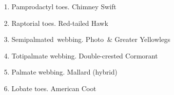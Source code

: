 \documentclass[11pt]{article}
\begin{document}
\begin{multicols}{2}
\begin{enumerate}[itemsep=1cm]
\item Pamprodactyl toes. \newline Chimney Swift
\item Raptorial toes. \newline Red-tailed Hawk
\item Semipalmated~webbing. Photo~\& Greater Yellowlegs%
\item Totipalmate webbing. \newline Double-crested Cormorant
\item Palmate webbing. \newline Mallard (hybrid)
\item Lobate toes. \newline American Coot
\end{enumerate}

\end{multicols}
\end{document}
